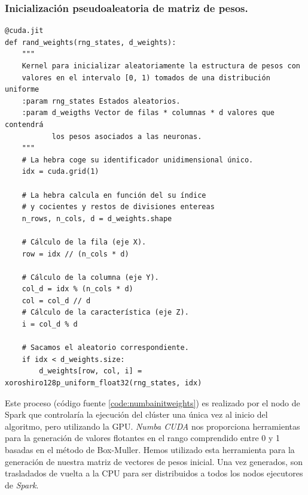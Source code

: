 \subsubsection{Inicialización pseudoaleatoria de matriz de pesos.}
\begin{code}
\begin{verbatim}
@cuda.jit
def rand_weights(rng_states, d_weights):
    """
    Kernel para inicializar aleatoriamente la estructura de pesos con 
    valores en el intervalo [0, 1) tomados de una distribución uniforme
    :param rng_states Estados aleatorios.
    :param d_weigths Vector de filas * columnas * d valores que contendrá 
           los pesos asociados a las neuronas.
    """
    # La hebra coge su identificador unidimensional único.
    idx = cuda.grid(1)

    # La hebra calcula en función del su índice 
    # y cocientes y restos de divisiones entereas
    n_rows, n_cols, d = d_weights.shape

    # Cálculo de la fila (eje X).
    row = idx // (n_cols * d)

    # Cálculo de la columna (eje Y).
    col_d = idx % (n_cols * d)
    col = col_d // d
    # Cálculo de la característica (eje Z).
    i = col_d % d
    
    # Sacamos el aleatorio correspondiente.
    if idx < d_weights.size:
        d_weights[row, col, i] = xoroshiro128p_uniform_float32(rng_states, idx)

\end{verbatim}
\label{code:numbainitweights}
\end{code}

Este proceso (código fuente \ref{code:numbainitweights}) es realizado por el nodo de Spark que controlaría la ejecución del clúster una única vez al inicio del algoritmo, pero utilizando la GPU. \textit{Numba CUDA} nos proporciona herramientas para la generación de valores flotantes en el rango comprendido entre 0 y 1 basadas en el método de Box-Muller. Hemos utilizado esta herramienta para la generación de nuestra matriz de vectores de pesos inicial. Una vez generados, son trasladados de vuelta a la CPU para ser distribuidos a todos los nodos ejecutores de \textit{Spark}. \\

